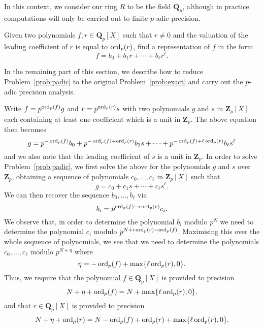 In this context, we consider our ring $R$ to be the field $\mathbf{Q}_p$, 
although in practice computations will only be carried out to finite 
$p$-adic precision.

\begin{prob} \label{prob:padic}
Given two polynomials $f, r \in \mathbf{Q}_p[X]$ such that 
$r \neq 0$ and the valuation of the leading coefficient of 
$r$ is equal to $\operatorname{ord}_p(r)$, find a representation of $f$ 
in the form
\begin{equation*}
f = b_0 + b_1 r + \dotsb + b_{\ell} r^{\ell}.
\end{equation*}
\end{prob}

In the remaining part of this section, we describe how to 
reduce Problem~\ref{prob:padic} to the original 
Problem~\ref{prob:exact} and carry out the $p$-adic precision 
analysis.

Write $f = p^{\operatorname{ord}_p(f)} g$ and $r = p^{\operatorname{ord}_p(r)} s$ 
with two polynomials $g$ and $s$ in $\mathbf{Z}_p[X]$ 
each containing at least one coefficient which is a unit 
in $\mathbf{Z}_p$.  The above equation then becomes
\begin{equation*}
g = p^{-\operatorname{ord}_p(f)} b_0 + p^{-\operatorname{ord}_p(f) + \operatorname{ord}_p(r)} b_1 s + \dotsb + p^{-\operatorname{ord}_p(f) + \ell \operatorname{ord}_p(r)} b_{\ell} s^{\ell}
\end{equation*}
and we also note that the leading coefficient of $s$ 
is a unit in $\mathbf{Z}_p$.
In order to solve Problem~\ref{prob:padic}, we first solve the above 
for the polynomials $g$ and $s$ over $\mathbf{Z}_p$, obtaining a 
sequence of polynomials $c_0, \dotsc, c_{\ell}$ in $\mathbf{Z}_p[X]$ 
such that 
\begin{equation*}
g = c_0 + c_1 s + \dotsb + c_{\ell} s^{\ell}.
\end{equation*}
We can then recover the sequence $b_0, \dotsc, b_{\ell}$ via 
\begin{equation*}
b_i = p^{\operatorname{ord}_p(f) - i \operatorname{ord}_p(r)} c_i.
\end{equation*}
We observe that, in order to determine the polynomial $b_i$ 
modulo $p^N$ we need to determine the polynomial $c_i$ 
modulo $p^{N + i \operatorname{ord}_p(r) - \operatorname{ord}_p(f)}$.  Maximising this 
over the whole sequence of polynomials, we see that we need 
to determine the polynomials $c_0, \dotsc, c_{\ell}$ modulo 
$p^{N + \eta}$ where
\begin{equation*}
\eta = - \operatorname{ord}_p(f) + \max\{\ell \operatorname{ord}_p(r), 0\}.
\end{equation*}
Thus, we require that the polynomial $f \in \mathbf{Q}_p[X]$ 
is provided to precision 
\begin{equation*}
N + \eta + \operatorname{ord}_p(f) = N + \max\{\ell \operatorname{ord}_p(r), 0\}.
\end{equation*}
and that $r \in \mathbf{Q}_p[X]$ is provided to precision 
\begin{equation*}
N + \eta + \operatorname{ord}_p(r) = N - \operatorname{ord}_p(f) + \operatorname{ord}_p(r) + \max\{\ell \operatorname{ord}_p(r), 0\}.
\end{equation*}


